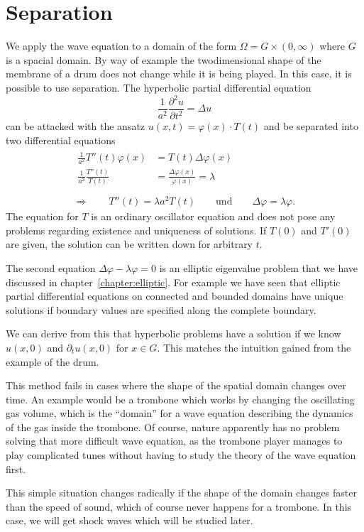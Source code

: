 %
%
%
\section{Separation}
We apply the wave equation to a domain of the form
$\Omega = G\times(0,\infty)$ where $G$ is a spacial domain.
By way of example the twodimensional shape of the membrane of a drum
does not change while it is being played.
In this case, it is possible to use separation.
The hyperbolic partial differential equation
\[
\frac1{a^2}\frac{\partial^2 u}{\partial t^2}=\Delta u
\]
can be attacked with the ansatz $u(x,t)=\varphi(x)\cdot T(t)$ and be 
separated into two differential equations
\begin{gather*}
\begin{aligned}
\frac1{a^2}T''(t)\varphi(x)&=T(t)\Delta \varphi(x)\\
\frac1{a^2}\frac{T''(t)}{T(t)}&=\frac{\Delta\varphi(x)}{\varphi(x)}=\lambda\\
\end{aligned}
\\
\Rightarrow\qquad
T''(t)=\lambda a^2T(t)\qquad\text{und}\qquad\Delta \varphi=\lambda\varphi.
\end{gather*}
The equation for $T$ is an ordinary oscillator equation and does
not pose any problems regarding existence and uniqueness of solutions.
If $T(0)$ and $T'(0)$ are given, the solution can be written down
for arbitrary $t$.

The second equation $\Delta \varphi-\lambda\varphi=0$ is an elliptic
eigenvalue problem that we have discussed in chapter~\ref{chapter:elliptic}.
For example we have seen that elliptic partial differential equations
on connected and bounded domains have unique solutions if boundary
values are specified along the complete boundary.

We can derive from this that hyperbolic problems have a solution if
we know $u(x,0)$ and $\partial_tu(x,0)$ for $x\in G$.
This matches the intuition gained from the example of the drum.

This method fails in cases where the shape of the spatial domain
changes over time.
An example would be a trombone which works by changing the oscillating
gas volume, which is the ``domain'' for a wave equation describing
the dynamics of the gas inside the trombone. 
Of course, nature apparently has no problem solving that more 
difficult wave equation, as the trombone player manages to play
complicated tunes without having to study the theory of the
wave equation first.

This simple situation changes radically if the shape of the domain
changes faster than the speed of sound, which of course never happens
for a trombone.
In this case, we will get shock waves which will be studied later.

